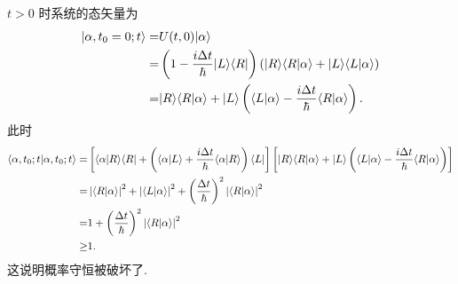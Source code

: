 \documentclass{assignment}
\begin{document}
\begin{sol}
\begin{itemize}
        $t>0$ 时系统的态矢量为
        \begin{align}
            \notag\lvert\alpha,t_0=0;t\rangle=&U(t,0)\lvert\alpha\rangle\\
            \notag=&\left(1-\frac{i\Delta t}{\hbar}\lvert L\rangle\langle R\lvert\right)(\lvert R\rangle\langle R\vert\alpha\rangle+\lvert L\rangle\langle L\vert\alpha\rangle)\\
            =&\lvert R\rangle\langle R\vert\alpha\rangle+\lvert L\rangle\left(\langle L\vert\alpha\rangle-\frac{i\Delta t}{\hbar}\langle R\vert\alpha\rangle\right).
        \end{align}
        此时
        \begin{align}
            \notag\langle\alpha,t_0;t\vert\alpha,t_0;t\rangle=&\left[\langle\alpha\vert R\rangle\langle R\rvert+\left(\langle\alpha\vert L\rangle+\frac{i\Delta t}{\hbar}\langle\alpha\vert R\rangle\right)\langle L\rvert\right]\left[\lvert R\rangle\langle R\vert\alpha\rangle+\lvert L\rangle\left(\langle L\vert\alpha\rangle-\frac{i\Delta t}{\hbar}\langle R\vert\alpha\rangle\right)\right]\\
            \notag=&\left\lvert\langle R\vert\alpha\rangle\right\rvert^2+\left\lvert\langle L\vert\alpha\rangle\right\rvert^2+\left(\frac{\Delta t}{\hbar}\right)^2\left\lvert\langle R\vert\alpha\rangle\right\rvert^2\\
            \notag=&1+\left(\frac{\Delta t}{\hbar}\right)^2\left\lvert\langle R\vert\alpha\rangle\right\rvert^2\\
            \geq&1.
        \end{align}
        这说明概率守恒被破坏了.
    \end{itemize}
\end{sol}
\end{document}
